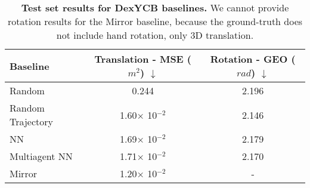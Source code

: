 \begin{table}
\centering \footnotesize
\begin{tabular}{@{}lcc@{}}
\toprule
Baseline &  Translation - MSE ($m^2$) $\downarrow$ & Rotation - GEO ($rad$) $\downarrow$           \\
\midrule
Random  & 0.244 & 2.196 \\
Random Trajectory & 1.60$\times$ 10$^{-2}$ & 2.146 \\
NN  & 1.69$\times$ 10$^{-2}$ &  2.179 \\
Multiagent NN  & 1.71$\times$ 10$^{-2}$ & 2.170 \\
Mirror  & 1.20$\times$ 10$^{-2}$  & -  \\
\bottomrule
\end{tabular}
\caption{\textbf{Test set results for DexYCB baselines.} We cannot provide rotation results for the Mirror baseline, because the ground-truth does not include hand rotation, only 3D translation.}
\label{tab:ho_baselines}
\end{table}








